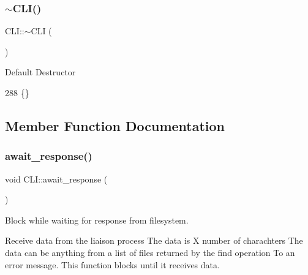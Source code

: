 \mbox{\label{class_c_l_i_a9f59d57abf434f7161fcf3f61b725752}} 
\subsubsection{\texorpdfstring{$\sim$\+C\+L\+I()}{~CLI()}}
{\footnotesize\ttfamily C\+L\+I\+::$\sim$\+C\+LI (\begin{DoxyParamCaption}{ }\end{DoxyParamCaption})}

Default Destructor 
\begin{DoxyCode}
288 \{\}
\end{DoxyCode}


\subsection{Member Function Documentation}
\mbox{\label{class_c_l_i_a87c68e5edcb5750d1199839e6b1f843e}} 
\subsubsection{\texorpdfstring{await\+\_\+response()}{await\_response()}}
{\footnotesize\ttfamily void C\+L\+I\+::await\+\_\+response (\begin{DoxyParamCaption}{ }\end{DoxyParamCaption})}



Block while waiting for response from filesystem. 

Receive data from the liaison process The data is X number of charachters The data can be anything from a list of files returned by the \textquotesingle{}find\textquotesingle{} operation To an error message. This function blocks until it receives data.


